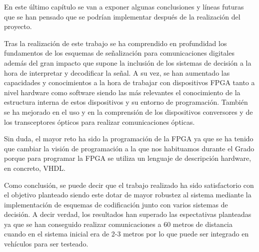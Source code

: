 




En este último capítulo se van a exponer algunas conclusiones y líneas futuras que se 
han pensado que se podrían implementar después de la realización del proyecto.

Tras la realización de este trabajo se ha comprendido en profundidad los fundamentos 
de los esquemas de señalización para comunicaciones digitales además del gran impacto
que supone la inclusión de los sistemas de decisión a la hora de interpretar y 
decodificar la señal. A su vez, se han aumentado las capacidades y conocimientos a la 
hora de trabajar con dispositivos FPGA tanto a nivel hardware como software siendo 
las más relevantes el conocimiento de la estructura interna de estos dispositivos y
su entorno de programación. También se ha mejorado en el uso y en la comprensión de 
los dispositivos conversores y de los transceptores ópticos para realizar comunicaciones
ópticas.

Sin duda, el mayor reto ha sido la programación de la FPGA ya 
que se ha tenido que cambiar la visión de programación a la que nos habituamos durante 
el Grado porque para programar la FPGA se utiliza
un lenguaje de descripción hardware, en concreto, VHDL. 

Como conclusión, se puede decir que el trabajo realizado ha sido satisfactorio con el 
objetivo planteado siendo este dotar de mayor robustez al sistema mediante la implementación
de esquemas de codificación junto con varios sistemas de decisión. A decir verdad, los 
resultados han superado las espectativas planteadas ya que se han conseguido realizar
comunicaciones a 60 metros de distancia cuando en el sistema inicial era de 2-3 metros por
lo que puede ser integrado en vehículos para ser testeado.

